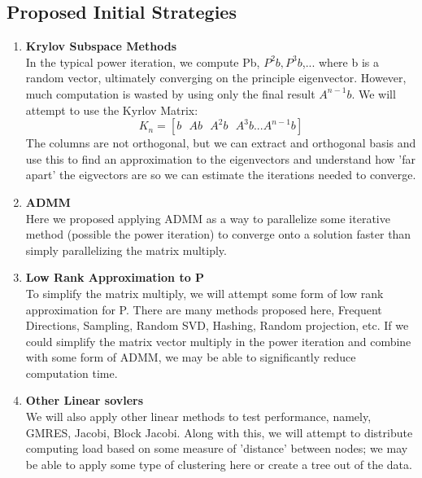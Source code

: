 \documentclass[a4paper,10pt]{article}
\begin{document}
\subsection{Proposed Initial Strategies}
\begin{enumerate}
\item \textbf{Krylov Subspace Methods} \\
In the typical power iteration, we compute Pb, $P^{2}b, P^{3}b$,... where b is a random vector, ultimately converging on the principle eigenvector. However, much computation is wasted by using only the final result $A^{n-1}b$. We will attempt to use the Kyrlov Matrix:
\begin{equation}
 K_{n} = [b \: \: \: Ab \: \: \:A^{2}b \: \: \:A^{3}b ... A^{n-1}b ]
\end{equation}
The columns are not orthogonal, but we can extract and orthogonal basis and use this to find an approximation to the eigenvectors and understand how 'far apart' the eigvectors are so we can estimate the iterations needed to converge.

\item \textbf{ADMM} \\
Here we proposed applying ADMM as a way to parallelize some iterative method (possible the power iteration) to converge onto a solution faster than simply parallelizing the matrix multiply.
\item \textbf{Low Rank Approximation to P} \\
To simplify the matrix multiply, we will attempt some form of low rank approximation for P. There are many methods proposed here, Frequent Directions, Sampling, Random SVD, Hashing, Random projection, etc. If we could simplify the matrix vector multiply in the power iteration and combine with some form of ADMM, we may be able to significantly reduce computation time. 
\item \textbf{Other Linear sovlers} \\
We will also apply other linear methods to test performance, namely, GMRES, Jacobi, Block Jacobi. Along with this, we will attempt to distribute computing load based on some measure of 'distance' between nodes; we may be able to apply some type of clustering here or create a tree out of the data.
\end{enumerate}
\end{document}
